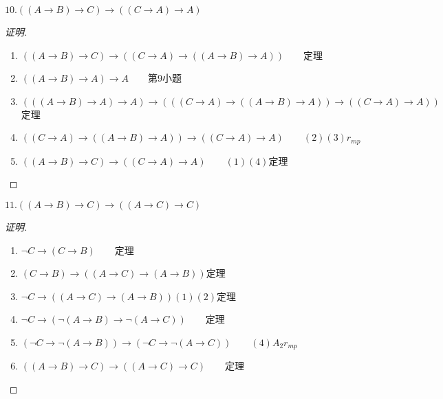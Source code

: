 \documentclass{article}
\begin{document}
\begin{CJK*}{UTF8}{gbsn}
$10.((A\to B)\to C)\to ((C\to A)\to A)$

\begin{proof}[证明]$\quad$

  \begin{enumerate}
    \item $((A\to B)\to C)\to ((C\to A)\to ((A\to B)\to A))\qquad$定理
    \item  $((A\to B)\to A)\to A\qquad$第9小题
    \item  $(((A\to B)\to A)\to A)\to (((C\to A)\to ((A\to B)\to A))\to ((C\to A)\to A))\qquad$定理
    \item $((C\to A)\to ((A\to B)\to A))\to ((C\to A)\to A)\qquad(2)(3)r_{mp}$
    \item $((A\to B)\to C)\to ((C\to A)\to A)\qquad(1)(4)$定理
  \end{enumerate}
\end{proof}

$11.((A\to B)\to C)\to ((A\to C)\to C)$
\begin{proof}[证明]$\quad$

  \begin{enumerate}
    \item $\lnot C\to (C\to B)\qquad$定理
    \item $(C\to B)\to ((A\to C)\to (A\to B))$定理
    \item $\lnot C\to((A\to C)\to (A\to B))(1)(2)$定理
    \item $\lnot C\to(\lnot (A\to B)\to \lnot (A\to C) )\qquad$定理
    \item  $(\lnot C\to\lnot (A\to B))\to( \lnot C\to \lnot (A\to C) )\qquad(4)A_2r_{mp}$
    \item $((A\to B)\to C)\to ((A\to C)\to C)\qquad$定理
  \end{enumerate}










\end{proof}
\end{CJK*}
\end{document}
